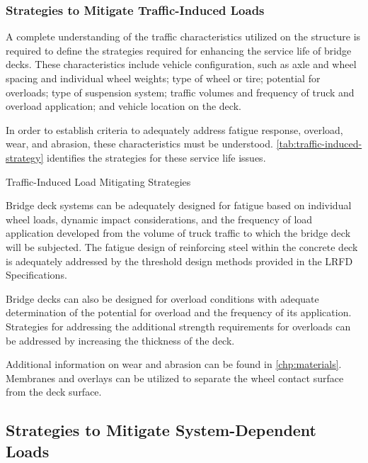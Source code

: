 \subsubsection*{Strategies to Mitigate Traffic-Induced Loads}
A complete understanding of the traffic characteristics utilized on the structure is required to define the strategies required for enhancing the service life of bridge decks. These characteristics include vehicle configuration, such as axle and wheel spacing and individual wheel weights; type of wheel or tire; potential for overloads; type of suspension system; traffic volumes and frequency of truck and overload application; and vehicle location on the deck.

In order to establish criteria to adequately address fatigue response, overload, wear, and abrasion, these characteristics must be understood. \cref{tab:traffic-induced-strategy} identifies the strategies for these service life issues.

\begin{table}
  \caption{Traffic-Induced Load Mitigating Strategies}
  \label{tab:traffic-induced-strategy}
\end{table}

Bridge deck systems can be adequately designed for fatigue based on individual wheel loads, dynamic impact considerations, and the frequency of load application developed from the volume of truck traffic to which the bridge deck will be subjected. The fatigue design of reinforcing steel within the concrete deck is adequately addressed by the threshold design methods provided in the LRFD Specifications.

Bridge decks can also be designed for overload conditions with adequate determination of the potential for overload and the frequency of its application. Strategies for addressing the additional strength requirements for overloads can be addressed by increasing the thickness of the deck.

Additional information on wear and abrasion can be found in \cref{chp:materials}. Membranes and overlays can be utilized to separate the wheel contact surface from the deck surface.

\subsection{Strategies to Mitigate System-Dependent Loads}
\label{subsec:strategies-mitigate-system-dependent}

